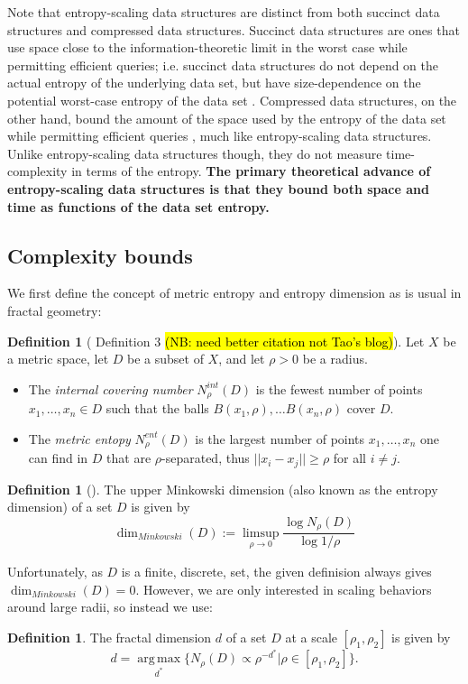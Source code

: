 \documentclass{amsbook}
\theoremstyle{definition}
\newtheorem{definition}[theorem]{Definition}
\theoremstyle{remark}
\numberwithin{equation}{section}
\begin{document}
Note that entropy-scaling data structures are distinct from both succinct data structures and compressed data structures.
Succinct data structures are ones that use space close to the information-theoretic limit in the worst case while permitting efficient queries; i.e.
succinct data structures do not depend on the actual entropy of the underlying data set, but have size-dependence on the potential worst-case entropy of the data set \cite{jacobson1988succinct}.
Compressed data structures, on the other hand, bound the amount of the space used by the entropy of the data set while permitting efficient queries \cite{grossi2005compressed, ferragina2000opportunistic}, much like entropy-scaling data structures.
Unlike entropy-scaling data structures though, they do not measure time-complexity in terms of the entropy.
\textbf{The primary theoretical advance of entropy-scaling data structures is that they bound both space and time as functions of the data set entropy.}

\subsection{Complexity bounds}
We first define the concept of metric entropy and entropy dimension as is usual in fractal geometry:
\begin{definition}[\cite{tao2014metric} Definition 3 \hl{(NB: need better citation not Tao's blog)}]
    Let $X$ be a metric space, let $D$ be a subset of $X$, and let $\rho>0$ be a radius.
    \begin{itemize}
        \item The \textit{internal covering number} $N_\rho^{int}(D)$ is the fewest number of points $x_1, \ldots, x_n \in D$ such that the balls $B(x_1,\rho), \ldots B(x_n,\rho)$ cover $D$.
        \item The \textit{metric entopy} $N_\rho^{ent}(D)$ is the largest number of points $x_1, \ldots, x_n$ one can find in $D$ that are $\rho$-separated, thus $||x_i - x_j|| \ge \rho$ for all $i \ne j$.
    \end{itemize}
\end{definition}
\begin{definition}[\cite{falconer2013fractal}]
    The upper Minkowski dimension (also known as the entropy dimension) of a set $D$ is given by 
\[
    \dim_{Minkowski}(D) := \limsup_{\rho \to 0} \frac{\log N_\rho(D)}{\log 1/\rho}
\]
\end{definition}
Unfortunately, as $D$ is a finite, discrete, set, the given definision always gives $\dim_{Minkowski}(D) = 0$.
However, we are only interested in scaling behaviors around large radii, so instead we use:
\begin{definition}
    The fractal dimension $d$ of a set $D$ at a scale $[\rho_1,\rho_2]$ is given by
    \[
        d = \operatorname*{arg\,max}_{d^*} \{ N_\rho(D) \propto \rho^{-d^*} | \rho \in [\rho_1,\rho_2] \}.
    \]
\end{definition}
\end{document}
